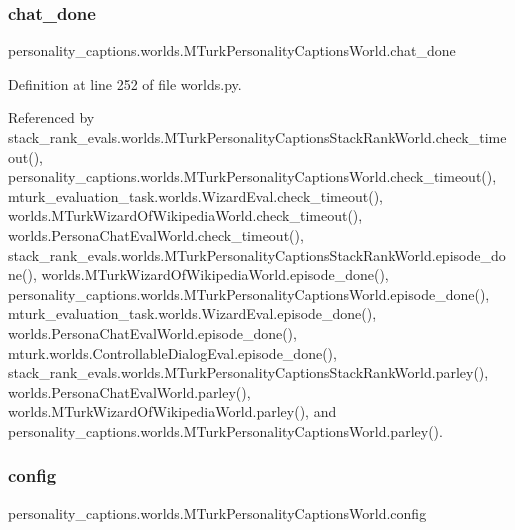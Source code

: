 \subsubsection{\texorpdfstring{chat\+\_\+done}{chat\_done}}
{\footnotesize\ttfamily personality\+\_\+captions.\+worlds.\+M\+Turk\+Personality\+Captions\+World.\+chat\+\_\+done}



Definition at line 252 of file worlds.\+py.



Referenced by stack\+\_\+rank\+\_\+evals.\+worlds.\+M\+Turk\+Personality\+Captions\+Stack\+Rank\+World.\+check\+\_\+timeout(), personality\+\_\+captions.\+worlds.\+M\+Turk\+Personality\+Captions\+World.\+check\+\_\+timeout(), mturk\+\_\+evaluation\+\_\+task.\+worlds.\+Wizard\+Eval.\+check\+\_\+timeout(), worlds.\+M\+Turk\+Wizard\+Of\+Wikipedia\+World.\+check\+\_\+timeout(), worlds.\+Persona\+Chat\+Eval\+World.\+check\+\_\+timeout(), stack\+\_\+rank\+\_\+evals.\+worlds.\+M\+Turk\+Personality\+Captions\+Stack\+Rank\+World.\+episode\+\_\+done(), worlds.\+M\+Turk\+Wizard\+Of\+Wikipedia\+World.\+episode\+\_\+done(), personality\+\_\+captions.\+worlds.\+M\+Turk\+Personality\+Captions\+World.\+episode\+\_\+done(), mturk\+\_\+evaluation\+\_\+task.\+worlds.\+Wizard\+Eval.\+episode\+\_\+done(), worlds.\+Persona\+Chat\+Eval\+World.\+episode\+\_\+done(), mturk.\+worlds.\+Controllable\+Dialog\+Eval.\+episode\+\_\+done(), stack\+\_\+rank\+\_\+evals.\+worlds.\+M\+Turk\+Personality\+Captions\+Stack\+Rank\+World.\+parley(), worlds.\+Persona\+Chat\+Eval\+World.\+parley(), worlds.\+M\+Turk\+Wizard\+Of\+Wikipedia\+World.\+parley(), and personality\+\_\+captions.\+worlds.\+M\+Turk\+Personality\+Captions\+World.\+parley().

\mbox{\label{classpersonality__captions_1_1worlds_1_1MTurkPersonalityCaptionsWorld_ad1c8f019f3cb67a2aa4bfc1b790047b6}} 
\subsubsection{\texorpdfstring{config}{config}}
{\footnotesize\ttfamily personality\+\_\+captions.\+worlds.\+M\+Turk\+Personality\+Captions\+World.\+config}



